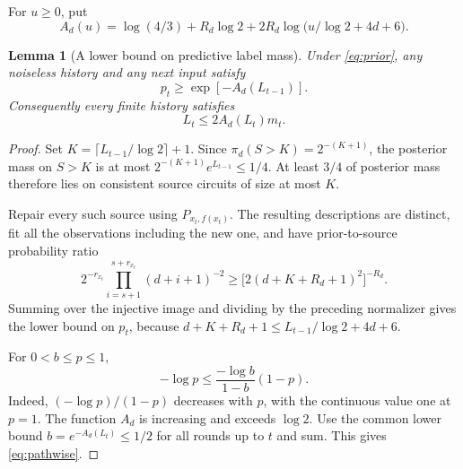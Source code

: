 \documentclass[11pt]{article}
\newtheorem{lemma}[theorem]{Lemma}
\newcommand{\1}{\mathbf 1}
\begin{document}
For $u\ge0$, put
\begin{equation}\label{eq:A}
 A_d(u)=\log(4/3)+R_d\log2+
          2R_d\log\bigl(u/\log2+4d+6\bigr).
\end{equation}

\begin{lemma}[A lower bound on predictive label mass]\label{lem:predictive}
Under \eqref{eq:prior}, any noiseless history and any next input satisfy
\[
 p_t\ge \exp[-A_d(L_{t-1})].
\]
Consequently every finite history satisfies
\begin{equation}\label{eq:pathwise}
 L_t\le2A_d(L_t)m_t.
\end{equation}
\end{lemma}
\begin{proof}
Set $K=\lceil L_{t-1}/\log2\rceil+1$. Since
$\pi_d(S>K)=2^{-(K+1)}$, the posterior mass on $S>K$ is at most
$2^{-(K+1)}e^{L_{t-1}}\le1/4$. At least $3/4$ of posterior mass
therefore lies on consistent source circuits of size at most $K$.

Repair every such source using $P_{x_t,f(x_t)}$. The resulting descriptions
are distinct, fit all the observations including the new one, and have
prior-to-source probability ratio
\[
 2^{-r_{x_t}}\prod_{i=s+1}^{s+r_{x_t}}(d+i+1)^{-2}
 \ge\bigl[2(d+K+R_d+1)^2\bigr]^{-R_d}.
\]
Summing over the injective image and dividing by the preceding normalizer
gives the lower bound on $p_t$, because
$d+K+R_d+1\le L_{t-1}/\log2+4d+6$.

For $0<b\le p\le1$,
\[
 -\log p\le\frac{-\log b}{1-b}(1-p).
\]
Indeed, $(-\log p)/(1-p)$ decreases with $p$, with the continuous value
one at $p=1$. The function $A_d$ is increasing and exceeds $\log2$.
Use the common lower bound $b=e^{-A_d(L_t)}\le1/2$ for all rounds up to
$t$ and sum. This gives \eqref{eq:pathwise}.
\end{proof}
\end{document}
